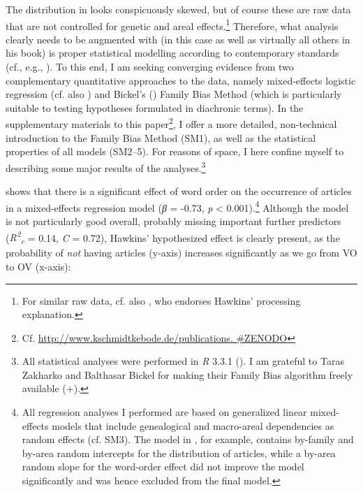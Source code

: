 \documentclass[output=paper]{langsci/langscibook}
\begin{document}
The distribution in  looks conspicuously skewed, but of course these are raw data that are not controlled for genetic and areal effects.\footnote{For similar raw data, cf. also \citet{Dryer2009}, who endorses Hawkins’ processing explanation.} Therefore, what  analysis clearly needs to be augmented with (in this case as well as virtually all others in his book) is proper statistical modelling according to contemporary standards (cf., e.g., \citealt{Bickel2011_Modelling}). To this end, I am seeking converging evidence from two complementary quantitative approaches to the data, namely mixed-effects logistic regression (cf. also \citealt{Cysouw2010_NP,JaegerEtAl2011}) and Bickel’s (\citeyear{Bickel2011_Modelling,Bickel2013}) Family Bias Method (which is particularly suitable to testing hypotheses formulated in diachronic terms). In the supplementary materials to this paper\footnote{Cf. \url{http://www.kschmidtkebode.de/publications. \#ZENODO}}, I offer a more detailed, non-technical introduction to the Family Bias Method (SM1), as well as the statistical properties of all models (SM2–5). For reasons of space, I here confine myself to describing some major results of the analyses.\footnote{All statistical analyses were performed in \textit{R} 3.3.1 (\citealt{RTeam2016}). I am grateful to Taras Zakharko and Balthasar Bickel for making their Family Bias algorithm freely available (\citealt{ZakharkoBickel2011}+).}

 shows that there is a significant effect of word order on the occurrence of articles in a mixed-effects regression model (\textit{β} = -0.73, \textit{p} < 0.001).\footnote{All regression analyses I performed are based on generalized linear mixed-effects models that include genealogical and macro-areal dependencies as random effects (cf. SM3). The model in , for example, contains by-family and by-area random intercepts for the distribution of articles, while a by-area random slope for the word-order effect did not improve the model significantly and was hence excluded from the final model.} Although the model is not particularly good overall, probably missing important further predictors (\textit{R\textsuperscript{2}}\textit{\textsubscript{c}} = 0.14, \textit{C} = 0.72), Hawkins’ hypothesized effect is clearly present, as the probability of \textit{not} having articles (y-axis) increases significantly as we go from VO to OV (x-axis):

  
\end{document}
